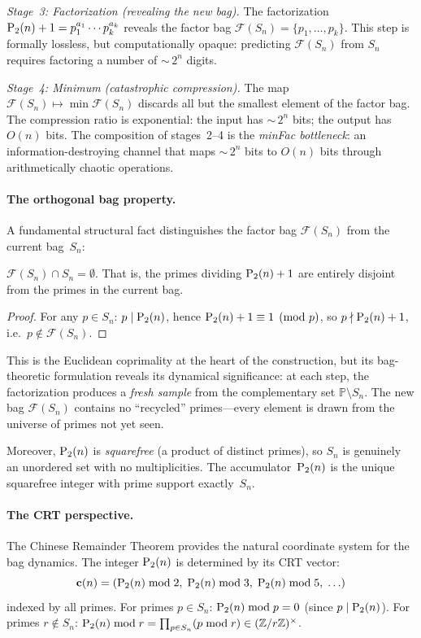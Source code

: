 \emph{Stage~3: Factorization (revealing the new bag).}  The factorization
$\mathrm{P}_{2}(n)+1 = p_1^{a_1} \cdots p_k^{a_k}$ reveals the factor bag
$\mathcal{F}(S_n) = \{p_1, \ldots, p_k\}$.  This step is formally
lossless, but computationally opaque: predicting $\mathcal{F}(S_n)$ from
$S_n$ requires factoring a number of ${\sim}\, 2^n$ digits.

\emph{Stage~4: Minimum (catastrophic compression).}  The map
$\mathcal{F}(S_n) \mapsto \min \mathcal{F}(S_n)$ discards all but the
smallest element of the factor bag.  The compression ratio is
exponential: the input has ${\sim}\, 2^n$ bits; the output has $O(n)$
bits.  The composition of stages~2--4 is the \emph{minFac bottleneck}:
an information-destroying channel that maps ${\sim}\, 2^n$ bits to
$O(n)$ bits through arithmetically chaotic operations.

\paragraph{The orthogonal bag property.}
A fundamental structural fact distinguishes the factor bag
$\mathcal{F}(S_n)$ from the current bag~$S_n$:

\begin{proposition}
$\mathcal{F}(S_n) \cap S_n = \emptyset$.
That is, the primes dividing $\mathrm{P}_{2}(n)+1$ are entirely disjoint from
the primes in the current bag.
\end{proposition}

\begin{proof}
For any $p \in S_n$: $p \mid \mathrm{P}_{2}(n)$, hence
$\mathrm{P}_{2}(n)+1 \equiv 1 \pmod{p}$, so $p \nmid \mathrm{P}_{2}(n)+1$, i.e.\
$p \notin \mathcal{F}(S_n)$.
\end{proof}

This is the Euclidean coprimality at the heart of the construction, but
its bag-theoretic formulation reveals its dynamical significance: at each
step, the factorization produces a \emph{fresh sample} from the
complementary set $\mathbb{P} \setminus S_n$.  The new bag
$\mathcal{F}(S_n)$ contains no ``recycled'' primes---every element is
drawn from the universe of primes not yet seen.

Moreover, $\mathrm{P}_{2}(n)$ is \emph{squarefree} (a product of distinct primes),
so $S_n$ is genuinely an unordered set with no multiplicities.  The
accumulator~$\mathrm{P}_{2}(n)$ is the unique squarefree integer with prime
support exactly~$S_n$.

\paragraph{The CRT perspective.}
The Chinese Remainder Theorem provides the natural coordinate system for
the bag dynamics.  The integer $\mathrm{P}_{2}(n)$ is determined by its CRT
vector:
\[
\mathbf{c}(n) = (\mathrm{P}_{2}(n) \bmod 2,\;
\mathrm{P}_{2}(n) \bmod 3,\; \mathrm{P}_{2}(n) \bmod 5,\; \ldots)
\]
indexed by all primes.  For primes $p \in S_n$:
$\mathrm{P}_{2}(n) \bmod p = 0$ (since $p \mid \mathrm{P}_{2}(n)$).  For primes
$r \notin S_n$: $\mathrm{P}_{2}(n) \bmod r = \prod_{p \in S_n} (p \bmod r)
\in (\mathbb{Z}/r\mathbb{Z})^\times$.

